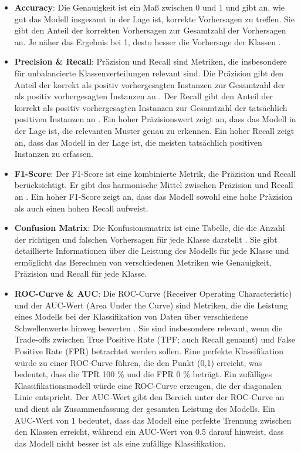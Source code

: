 \documentclass[conference]{IEEEtran}
\begin{document}
\begin{itemize}
    \item \textbf{Accuracy}: Die Genauigkeit ist ein Maß zwischen 0 und 1 und gibt an, wie gut das Modell insgesamt in der Lage ist, korrekte Vorhersagen zu treffen. Sie gibt den Anteil der korrekten Vorhersagen zur Gesamtzahl der Vorhersagen an. Je näher das Ergebnis bei 1, desto besser die Vorhersage der Klassen \cite{scikit_accuracy}.
    \item \textbf{Precision \& Recall}: Präzision und Recall sind Metriken, die insbesondere für unbalancierte Klassenverteilungen relevant sind. Die Präzision gibt den Anteil der korrekt als positiv vorhergesagten Instanzen zur Gesamtzahl der als positiv vorhergesagten Instanzen an \cite{scikit_pre}. Der Recall gibt den Anteil der korrekt als positiv vorhergesagten Instanzen zur Gesamtzahl der tatsächlich positiven Instanzen an \cite{scikit_recall}.
          Ein hoher Präzisionswert zeigt an, dass das Modell in der Lage ist, die relevanten Muster genau zu erkennen. Ein hoher Recall zeigt an, dass das Modell in der Lage ist, die meisten tatsächlich positiven Instanzen zu erfassen.
    \item \textbf{F1-Score}: Der F1-Score ist eine kombinierte Metrik, die Präzision und Recall berücksichtigt. Er gibt das harmonische Mittel zwischen Präzision und Recall an \cite{scikit_f1}. Ein hoher F1-Score zeigt an, dass das Modell sowohl eine hohe Präzision als auch einen hohen Recall aufweist.
    \item \textbf{Confusion Matrix}: Die Konfusionsmatrix ist eine Tabelle, die die Anzahl der richtigen und falschen Vorhersagen für jede Klasse darstellt \cite{scikit_conf}. Sie gibt detaillierte Informationen über die Leistung des Modells für jede Klasse und ermöglicht das Berechnen von verschiedenen Metriken wie Genauigkeit, Präzision und Recall für jede Klasse.
    \item \textbf{ROC-Curve \& AUC}: Die ROC-Curve (Receiver Operating Characteristic) und der AUC-Wert (Area Under the Curve) sind Metriken, die die Leistung eines Modells bei der Klassifikation von Daten über verschiedene Schwellenwerte hinweg bewerten \cite{scikit_roc}. Sie sind insbesondere relevant, wenn die Trade-offs zwischen True Positive Rate (TPF; auch Recall genannt) und False Positive Rate (FPR) betrachtet werden sollen.
          Eine perfekte Klassifikation würde zu einer ROC-Curve führen, die den Punkt (0,1) erreicht, was bedeutet, dass die TPR 100 \% und die FPR 0 \% beträgt. Ein zufälliges Klassifikationsmodell würde eine ROC-Curve erzeugen, die der diagonalen Linie entspricht. Der AUC-Wert gibt den Bereich unter der ROC-Curve an und dient als Zusammenfassung der gesamten Leistung des Modells. Ein AUC-Wert von 1 bedeutet, dass das Modell eine perfekte Trennung zwischen den Klassen erreicht, während ein AUC-Wert von 0.5 darauf hinweist, dass das Modell nicht besser ist als eine zufällige Klassifikation.
\end{itemize}
\end{document}
